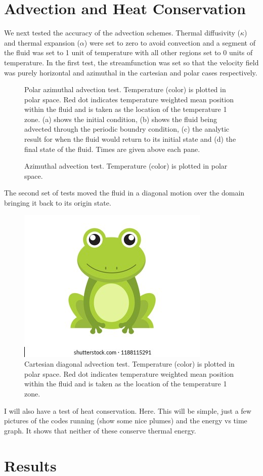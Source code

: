 \documentclass{article}
\begin{document}
\section*{Advection and Heat Conservation}
We next tested the accuracy of the advection schemes. Thermal diffusivity ($\kappa$) and thermal expansion ($\alpha$) were set to zero to avoid convection and a segment of the fluid was set to 1 unit of temperature with all other regions set to 0 units of temperature. In the first test, the streamfunction was set so that the velocity field was purely horizontal and azimuthal in the cartesian and polar cases respectively. 

\begin{figure}
	\centering
	\caption{Polar azimuthal advection test. Temperature (color) is plotted in polar space. Red dot indicates temperature weighted mean position within the fluid and is taken as the location of the temperature 1 zone. 
	(a) shows the initial condition, (b) shows the fluid being advected through the periodic boundry condition, (c) the analytic result for when the fluid would return to its initial state and (d) the final state of the fluid.
	Times are given above each pane.}
\end{figure}


\begin{figure}
	\centering
	\caption{Azimuthal advection test. Temperature (color) is plotted in polar space. }
\end{figure}

The second set of tests moved the fluid in a diagonal motion over the domain bringing it back to its origin state. 

\begin{figure}
	\centering
	\includegraphics{frog.png}
	\caption{Cartesian diagonal advection test. Temperature (color) is plotted in polar space. Red dot indicates temperature weighted mean position within the fluid and is taken as the location of the temperature 1 zone.}
\end{figure}

I will also have a test of heat conservation. Here. This will be simple, just a few pictures of the codes running (show some nice plumes) and the energy vs time graph. It shows that neither of these conserve thermal energy.


\section*{Results}

\section*{}
\end{document}
